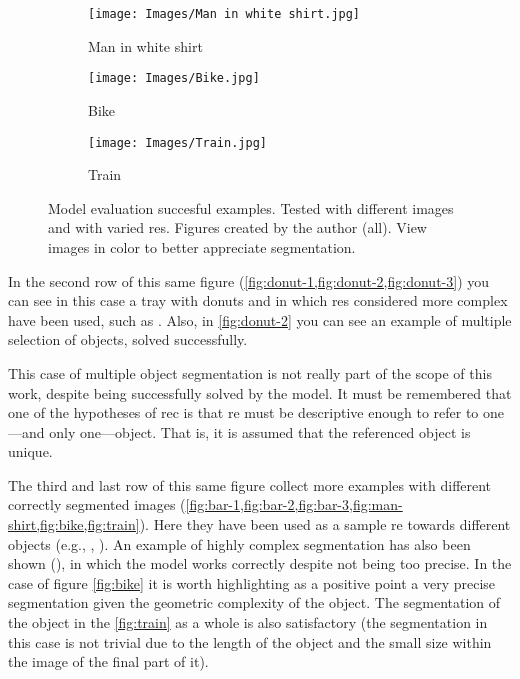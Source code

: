 \begin{figure}[p]
  \bigskip
  \begin{subfigure}[t]{.32\textwidth}
    \centering
    \caption{Man in white shirt}\label{fig:man-shirt}
    \texttt{[image: Images/Man in white shirt.jpg]}
  \end{subfigure}\hfill
  \begin{subfigure}[t]{.32\textwidth}
    \centering
    \caption{Bike}\label{fig:bike}
    \texttt{[image: Images/Bike.jpg]}
  \end{subfigure}\hfill
  \begin{subfigure}[t]{.32\textwidth}
    \centering
    \caption{Train}\label{fig:train}
    \texttt{[image: Images/Train.jpg]}
  \end{subfigure}
  \caption[Model evaluation succesful examples]{Model evaluation succesful
    examples. Tested with different images and with varied \glspl{re}. Figures
    created by the author (all). View images in color to better appreciate
    segmentation.}%
  \label{fig:success}
\end{figure}

In the second row of this same figure
(\vref{fig:donut-1,fig:donut-2,fig:donut-3}) you can see in this case a tray
with donuts and in which \glspl{re} considered more complex have been used,
such as . Also, in \vref{fig:donut-2} you can see an example
of multiple selection of objects, solved successfully.

\begin{remarkBox}
  This case of multiple object segmentation is not really part of the scope of
  this work, despite being successfully solved by the model. It must be
  remembered that one of the hypotheses of \gls{rec} is that \gls{re} must be
  descriptive enough to refer to one---and only one---object. That is, it is
  assumed that the referenced object is unique.
\end{remarkBox}

The third and last row of this same figure collect more examples with different
correctly segmented images
(\vref{fig:bar-1,fig:bar-2,fig:bar-3,fig:man-shirt,fig:bike,fig:train}). Here
they have been used as a sample \gls{re} towards different objects (e.g.,
, ). An example of highly complex segmentation has also been
shown (), in which the model works correctly despite not
being too precise. In the case of figure \vref{fig:bike} it is worth
highlighting as a positive point a very precise segmentation given the
geometric complexity of the object. The segmentation of the object 
in the \vref{fig:train} as a whole is also satisfactory (the segmentation in
this case is not trivial due to the length of the object and the small size
within the image of the final part of it).

